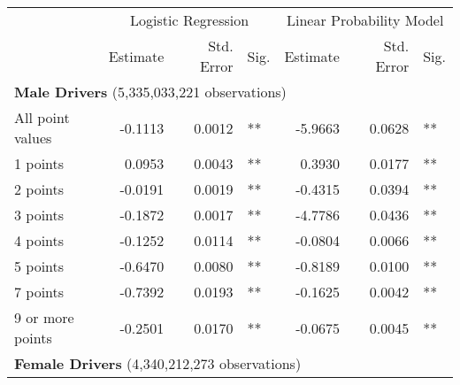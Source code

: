 
\begin{table}%
\centering 
\begin{tabular}{l r r l r r l} 

\hline 
 
 & \multicolumn{3}{c}{Logistic Regression}  & \multicolumn{3}{c}{Linear Probability Model} \\ 

 \cmidrule(lr){2-4}\cmidrule(lr){5-7} 
 & Estimate & Std. Error & Sig. & Estimate & Std. Error & Sig. \\ 

\hline 
 
\multicolumn{7}{l}{\textbf{Male Drivers} (5,335,033,221 observations)} \\ 

All point values                &  -0.1113        &  0.0012       &   **       &  -5.9663        &  0.0628       &   **       \\ 
1 points                        &  0.0953        &  0.0043       &   **       &  0.3930        &  0.0177       &   **       \\ 
2 points                        &  -0.0191        &  0.0019       &   **       &  -0.4315        &  0.0394       &   **       \\ 
3 points                        &  -0.1872        &  0.0017       &   **       &  -4.7786        &  0.0436       &   **       \\ 
4 points                        &  -0.1252        &  0.0114       &   **       &  -0.0804        &  0.0066       &   **       \\ 
5 points                        &  -0.6470        &  0.0080       &   **       &  -0.8189        &  0.0100       &   **       \\ 
7 points                        &  -0.7392        &  0.0193       &   **       &  -0.1625        &  0.0042       &   **       \\ 
9 or more points                &  -0.2501        &  0.0170       &   **       &  -0.0675        &  0.0045       &   **       \\ 

\hline 

\multicolumn{7}{l}{\textbf{Female Drivers} (4,340,212,273 observations)} \\ 


\end{tabular}
\end{table}
